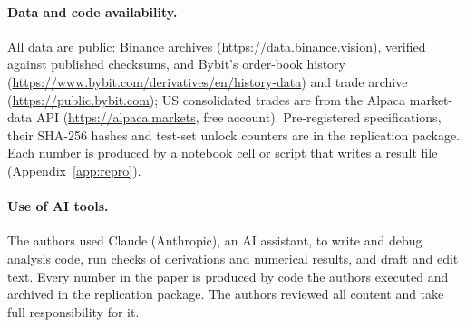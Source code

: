 \documentclass[12pt]{article}
\theoremstyle{definition}
\theoremstyle{remark}
\begin{document}
\paragraph{Data and code availability.} All data are public: Binance archives (\url{https://data.binance.vision}), verified against published checksums, and Bybit's order-book history (\url{https://www.bybit.com/derivatives/en/history-data}) and trade archive (\url{https://public.bybit.com}); US consolidated trades are from the Alpaca market-data API (\url{https://alpaca.markets}, free account). Pre-registered specifications, their SHA-256 hashes and test-set unlock counters are in the replication package. Each number is produced by a notebook cell or script that writes a result file (Appendix~\ref{app:repro}).

\paragraph{Use of AI tools.} The authors used Claude (Anthropic), an AI assistant, to write and debug analysis code, run checks of derivations and numerical results, and draft and edit text. Every number in the paper is produced by code the authors executed and archived in the replication package. The authors reviewed all content and take full responsibility for it.
\end{document}
